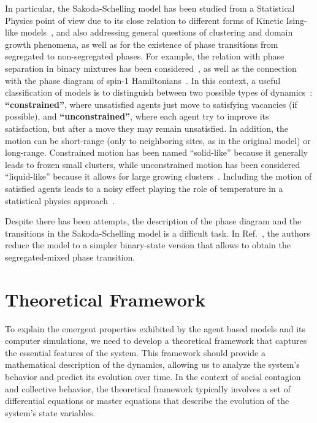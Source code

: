 In particular, the Sakoda-Schelling model has been studied from a Statistical Physics point of view due to its close relation to different forms of Kinetic Ising-like models~\cite{stauffer-2007,stauffer-2013}, and also addressing general questions of clustering and domain growth phenomena, as well as for the existence of phase transitions from segregated to non-segregated phases. For example, the relation with phase separation in binary mixtures has been considered~\cite{Dall_Asta_2008,Vinkovic}, as well as the connection with the phase diagram of spin-1 Hamiltonians~\cite{BEG,BlumeCapel,Gauvin_2009,Gauvin_2010}. In this context, a useful classification of models is to distinguish between two possible types of dynamics~\cite{Dall_Asta_2008}: \textbf{``constrained''}, where unsatisfied agents just move to satisfying vacancies (if possible), and \textbf{``unconstrained''},  where each agent try to improve its satisfaction, but after a move they may remain unsatisfied. In addition, the motion can be short-range (only to neighboring sites, as in the original model) or long-range. Constrained motion has been named ``solid-like'' because it generally leads to frozen small clusters, while unconstrained motion has been considered ``liquid-like'' because it allows for large growing clusters~\cite{Vinkovic}. Including the motion of satisfied agents leads to a noisy effect playing the role of temperature in a statistical physics approach~\cite{Gauvin_2009,Gauvin_2010}.

Despite there has been attempts, the description of the phase diagram and the transitions in the Sakoda-Schelling model is a difficult task. In Ref.~\cite{lucquiaud2022modeliser}, the authors reduce the model to a simpler binary-state version that allows to obtain the segregated-mixed phase transition.

\section{\label{sec:Theoretical Framework} Theoretical Framework}

To explain the emergent properties exhibited by the agent based models and its computer simulations, we need to develop a theoretical framework that captures the essential features of the system. This framework should provide a mathematical description of the dynamics, allowing us to analyze the system's behavior and predict its evolution over time. In the context of social contagion and collective behavior, the theoretical framework typically involves a set of differential equations or master equations that describe the evolution of the system's state variables.

